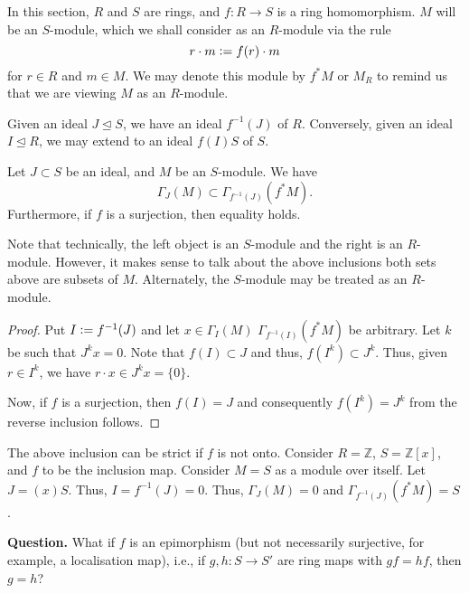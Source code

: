 In this section, $R$ and $S$ are rings, and $f : R \to S$ is a ring homomorphism. $M$ will be an $S$-module, which we shall consider as an $R$-module via the rule
\begin{equation*} 
	r \cdot m \vcentcolon= f(r) \cdot m
\end{equation*}
for $r \in R$ and $m \in M$. We may denote this module by $f^{\ast}M$ or $M_{R}$ to remind us that we are viewing $M$ as an $R$-module.

Given an ideal $J \unlhd S$, we have an ideal $f^{-1}(J)$ of $R$. \newline
Conversely, given an ideal $I \unlhd R$, we may extend to an ideal $f(I) S$ of $S$.

\begin{prop}
	Let $J \subset S$ be an ideal, and $M$ be an $S$-module. We have
	\begin{equation*} 
		\Gamma_{J}(M) \subset \Gamma_{f^{-1}(J)}(f^{\ast}M).
	\end{equation*}
	Furthermore, if $f$ is a surjection, then equality holds.
\end{prop}
Note that technically, the left object is an $S$-module and the right is an $R$-module. However, it makes sense to talk about the above inclusions both sets above are subsets of $M$. Alternately, the $S$-module may be treated as an $R$-module.
\begin{proof} 
	Put $I \vcentcolon= f^{-1}(J)$ and let $x \in \Gamma_{I}(M)$ $\Gamma_{f^{-1}(I)}(f^{\ast}M)$ be arbitrary. Let $k$ be such that $J^{k} x = 0$. Note that $f(I) \subset J$ and thus, $f(I^{k}) \subset J^{k}$. Thus, given $r \in I^{k}$, we have $r \cdot x \in J^{k} x = \{0\}$. 

	Now, if $f$ is a surjection, then $f(I) = J$ and consequently $f(I^{k}) = J^{k}$ from the reverse inclusion follows.
\end{proof}

\begin{ex}
	The above inclusion can be strict if $f$ is not onto. Consider $R = \mathbb{Z}$, $S = \mathbb{Z}[x]$, and $f$ to be the inclusion map. Consider $M = S$ as a module over itself. Let $J = (x)S$. Thus, $I = f^{-1}(J) = 0$. Thus, $\Gamma_{J}(M) = 0$ and $\Gamma_{f^{-1}(J)}(f^{\ast}M) = S$.
\end{ex}

\textbf{Question.} What if $f$ is an epimorphism (but not necessarily surjective, for example, a localisation map), i.e., if $g, h : S \to S'$ are ring maps with $gf = hf$, then $g = h$?

